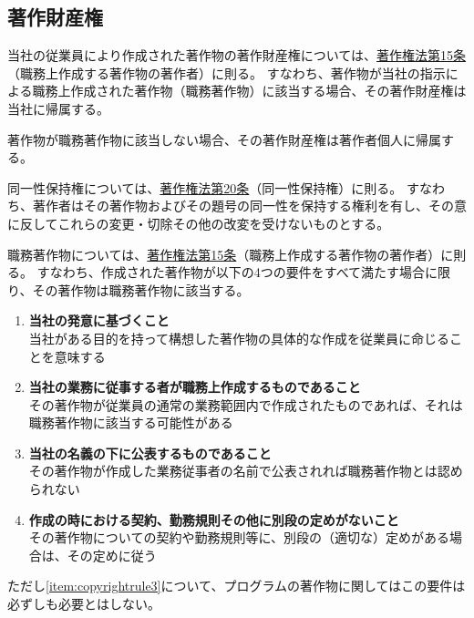 \subsection{著作財産権}
当社の従業員により作成された著作物の著作財産権については、\href{https://elaws.e-gov.go.jp/document?lawid=345AC0000000048#Mp-At_15}{著作権法第15条}（職務上作成する著作物の著作者）\cite{eGovCopyrightLaw}に則る。
すなわち、著作物が当社の指示による職務上作成された著作物（職務著作物）に該当する場合、その著作財産権は当社に帰属する。

著作物が職務著作物に該当しない場合、その著作財産権は著作者個人に帰属する。



同一性保持権については、\href{https://elaws.e-gov.go.jp/document?lawid=345AC0000000048\#Mp-At_20}{著作権法第20条}（同一性保持権）に則る。
すなわち、著作者はその著作物およびその題号の同一性を保持する権利を有し、その意に反してこれらの変更・切除その他の改変を受けないものとする。


職務著作物については、\href{https://elaws.e-gov.go.jp/document?lawid=345AC0000000048\#Mp-At_15}{著作権法第15条}（職務上作成する著作物の著作者）に則る。
すなわち、作成された著作物が以下の4つの要件をすべて満たす場合に限り、その著作物は職務著作物に該当する。
\begin{enumerate}[label=\Roman*., ref=\Roman*]
\item \textbf{当社の発意に基づくこと}\\
当社がある目的を持って構想した著作物の具体的な作成を従業員に命じることを意味する
\item \textbf{当社の業務に従事する者が職務上作成するものであること}\\
その著作物が従業員の通常の業務範囲内で作成されたものであれば、それは職務著作物に該当する可能性がある
\item\label{item:copyrightrule3} \textbf{当社の名義の下に公表するものであること}\\
その著作物が作成した業務従事者の名前で公表されれば職務著作物とは認められない
\item \textbf{作成の時における契約、勤務規則その他に別段の定めがないこと}\\
その著作物についての契約や勤務規則等に、別段の（適切な）定めがある場合は、その定めに従う
\end{enumerate}
ただし\ref{item:copyrightrule3}について、プログラムの著作物に関してはこの要件は必ずしも必要とはしない。



